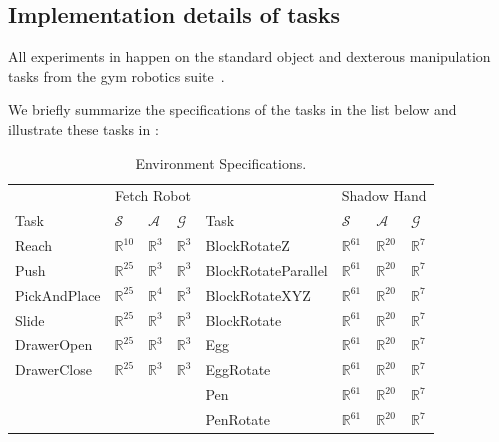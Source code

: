 \documentclass[dvipsnames]{article} %
\theoremstyle{definition}
\theoremstyle{remark}
\begin{document}
\subsection{Implementation details of tasks}
\label{subsec:task_detail}
All experiments in  happen on the standard object and dexterous manipulation tasks from the gym robotics suite~\citep{plappert2018multi}.

We briefly summarize the specifications of the tasks in the list below and illustrate these tasks in :

\begin{table}[!ht]
    \centering\small
    \caption{Environment Specifications.}\label{tab:env_spec}
    \vspace{-0.5em}
    \begin{tabular}{llll|llll}
    \toprule
        & \multicolumn{3}{c|}{Fetch Robot}                                   & & \multicolumn{3}{c}{Shadow Hand} \\ 
        Task & $\mathcal S$ & $\mathcal A$ & $\mathcal G$                    & Task & $\mathcal S$ & $\mathcal A$ & $\mathcal G$ \\
        \midrule
        Reach & $\mathbb{R}^{10}$ & $\mathbb{R}^3$ & $\mathbb{R}^3$          & BlockRotateZ & $\mathbb{R}^{61}$ & $\mathbb{R}^{20}$ & $\mathbb{R}^{7}$ \\                      
        Push & $\mathbb{R}^{25}$ & $\mathbb{R}^3$ & $\mathbb{R}^3$           & BlockRotateParallel & $\mathbb{R}^{61}$ & $\mathbb{R}^{20}$ & $\mathbb{R}^{7}$ \\
        PickAndPlace & $\mathbb{R}^{25}$ & $\mathbb{R}^4$ & $\mathbb{R}^3$   & BlockRotateXYZ & $\mathbb{R}^{61}$ & $\mathbb{R}^{20}$ & $\mathbb{R}^{7}$ \\
        Slide & $\mathbb{R}^{25}$ & $\mathbb{R}^3$ & $\mathbb{R}^3$          & BlockRotate & $\mathbb{R}^{61}$ & $\mathbb{R}^{20}$ & $\mathbb{R}^{7}$ \\
        DrawerOpen & $\mathbb{R}^{25}$ & $\mathbb{R}^3$ & $\mathbb{R}^3$     & Egg & $\mathbb{R}^{61}$ & $\mathbb{R}^{20}$ & $\mathbb{R}^{7}$ \\
        DrawerClose & $\mathbb{R}^{25}$ & $\mathbb{R}^3$ & $\mathbb{R}^3$    & EggRotate & $\mathbb{R}^{61}$ & $\mathbb{R}^{20}$ & $\mathbb{R}^{7}$ \\
        \multicolumn{4}{c|}{}                                                & Pen & $\mathbb{R}^{61}$ & $\mathbb{R}^{20}$ & $\mathbb{R}^{7}$ \\ 
        \multicolumn{4}{c|}{}                                                & PenRotate & $\mathbb{R}^{61}$ & $\mathbb{R}^{20}$ & $\mathbb{R}^{7}$ \\ 
        \bottomrule
    \end{tabular}                                                            
\end{table}
\end{document}
